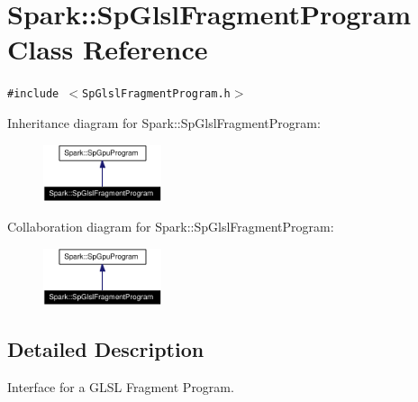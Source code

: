 \section{Spark::Sp\-Glsl\-Fragment\-Program Class Reference}
\label{classSpark_1_1SpGlslFragmentProgram}
{\tt \#include $<$Sp\-Glsl\-Fragment\-Program.h$>$}

Inheritance diagram for Spark::Sp\-Glsl\-Fragment\-Program:\begin{figure}[H]
\begin{center}
\leavevmode
\includegraphics[width=98pt]{classSpark_1_1SpGlslFragmentProgram__inherit__graph}
\end{center}
\end{figure}
Collaboration diagram for Spark::Sp\-Glsl\-Fragment\-Program:\begin{figure}[H]
\begin{center}
\leavevmode
\includegraphics[width=98pt]{classSpark_1_1SpGlslFragmentProgram__coll__graph}
\end{center}
\end{figure}


\subsection{Detailed Description}
Interface for a GLSL Fragment Program. 

